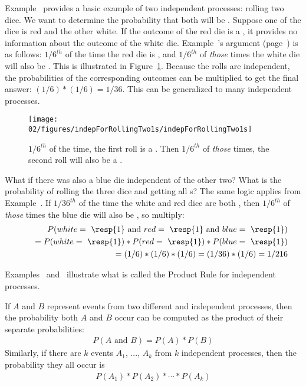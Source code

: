Example~ provides a basic example of two independent processes: rolling two dice. We want to determine the probability that both will be . Suppose one of the dice is red and the other white. If the outcome of the red die is a , it provides no information about the outcome of the white die. Example~'s argument (page~\pageref{probOf2Ones}) is as follows: $1/6^{th}$ of the time the red die is , and $1/6^{th}$ of \emph{those} times the white die will also be . This is illustrated in Figure~\ref{indepForRollingTwo1s}. Because the rolls are independent, the probabilities of the corresponding outcomes can be multiplied to get the final answer: $(1/6)*(1/6)=1/36$. This can be generalized to many independent processes. 
\begin{figure}[hht]
\centering
\texttt{[image: 02/figures/indepForRollingTwo1s/indepForRollingTwo1s]}
\caption{$1/6^{th}$ of the time, the first roll is a . Then $1/6^{th}$ of \emph{those} times, the second roll will also be a .}
\label{indepForRollingTwo1s}
\end{figure}

\begin{example}{What if there was also a blue die independent of the other two? What is the probability of rolling the three dice and getting all s?}\label{threeDice}
The same logic applies from Example~. If $1/36^{th}$ of the time the white and red dice are both , then $1/6^{th}$ of \emph{those} times the blue die will also be , so multiply:
\begin{eqnarray*}
&&P(white=\text{ \resp{1} and } red=\text{ \resp{1} and } blue=\text{ \resp{1}}) \\
&&\quad= P(white=\text{ \resp{1}})*P(red=\text{ \resp{1}})*P(blue=\text{ \resp{1}}) \\
&&\quad = (1/6)*(1/6)*(1/6) = (1/36)*(1/6) = 1/216
\end{eqnarray*}
\end{example}

Examples~ and~ illustrate what is called the Product Rule for independent processes. 

\begin{termBox}{
If $A$ and $B$ represent events from two different and independent processes, then the probability both $A$ and $B$ occur can be computed as the product of their separate probabilities: \vspace{-1.5mm}
\begin{eqnarray}\label{eqForIndependentEvents}
P(A \text{ and }B) = P(A) * P(B)
\end{eqnarray}
Similarly, if there are $k$ events $A_1$, ..., $A_k$ from $k$ independent processes, then the probability they all occur is\vspace{-1.5mm}
\begin{eqnarray*}
P(A_1) * P(A_2)* \cdots * P(A_k)
\end{eqnarray*}\vspace{-7mm}}
\end{termBox}

